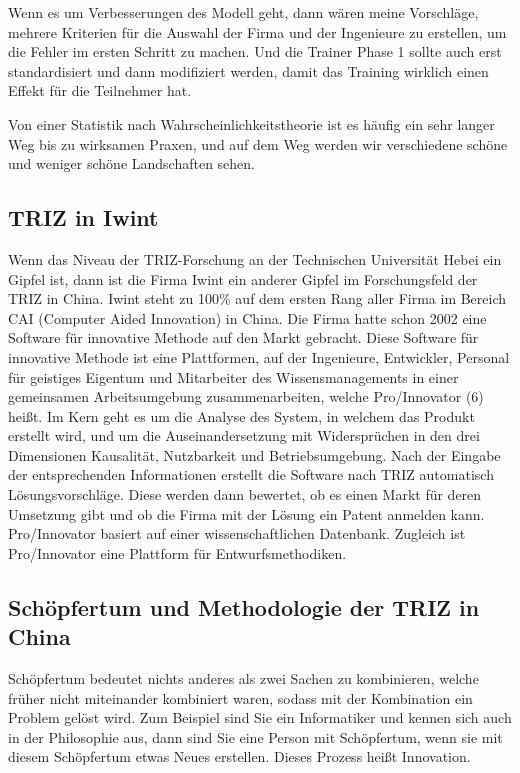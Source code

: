\documentclass[11pt,a4paper]{article}
\begin{document}
Wenn es um Verbesserungen des Modell geht, dann wären meine Vorschläge,
mehrere Kriterien für die Auswahl der Firma und der Ingenieure zu erstellen,
um die Fehler im ersten Schritt zu machen. Und die Trainer Phase 1 sollte auch
erst standardisiert und dann modifiziert werden, damit das Training wirklich
einen Effekt für die Teilnehmer hat.

Von einer Statistik nach Wahrscheinlichkeitstheorie ist es häufig ein sehr
langer Weg bis zu wirksamen Praxen, und auf dem Weg werden wir verschiedene
schöne und weniger schöne Landschaften sehen.

\subsection{TRIZ in Iwint}
Wenn das Niveau der TRIZ-Forschung an der Technischen Universität Hebei ein
Gipfel ist, dann ist die Firma Iwint ein anderer Gipfel im Forschungsfeld der
TRIZ in China. Iwint steht zu 100\% auf dem ersten Rang aller Firma im Bereich
CAI (Computer Aided Innovation) in China.  Die Firma hatte schon 2002 eine
Software für innovative Methode auf den Markt gebracht. Diese Software für
innovative Methode ist eine Plattformen, auf der Ingenieure, Entwickler,
Personal für geistiges Eigentum und Mitarbeiter des Wissensmanagements in
einer gemeinsamen Arbeitsumgebung zusammenarbeiten, welche Pro/Innovator (6)
heißt.  Im Kern geht es um die Analyse des System, in welchem das Produkt
erstellt wird, und um die Auseinandersetzung mit Widersprüchen in den drei
Dimensionen Kausalität, Nutzbarkeit und Betriebsumgebung.  Nach der Eingabe
der entsprechenden Informationen erstellt die Software nach TRIZ automatisch
Lösungsvorschläge. Diese werden dann bewertet, ob es einen Markt für deren
Umsetzung gibt und ob die Firma mit der Lösung ein Patent anmelden kann.
Pro/Innovator basiert auf einer wissenschaftlichen Datenbank. Zugleich ist
Pro/Innovator eine Plattform für Entwurfsmethodiken.

\subsection{Schöpfertum und Methodologie der TRIZ in China}
Schöpfertum bedeutet nichts anderes als zwei Sachen zu kombinieren, welche
früher nicht miteinander kombiniert waren, sodass mit der Kombination ein
Problem gelöst wird. Zum Beispiel sind Sie ein Informatiker und kennen sich
auch in der Philosophie aus, dann sind Sie eine Person mit Schöpfertum, wenn
sie mit diesem Schöpfertum etwas Neues erstellen. Dieses Prozess heißt
Innovation.
\end{document}
